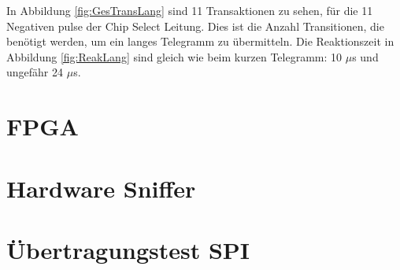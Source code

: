 In Abbildung \ref{fig:GesTransLang} sind 11 Transaktionen zu sehen, für die 11 Negativen pulse der Chip Select Leitung. Dies ist die Anzahl Transitionen, die benötigt werden, um ein langes Telegramm zu übermitteln. Die Reaktionszeit in Abbildung \ref{fig:ReakLang} sind gleich wie beim kurzen Telegramm: 10 $\mu$s und ungefähr 24 $\mu$s.





\section{FPGA}
\label{sec:ResultatFPGA}



\section{Hardware Sniffer}
\label{sec:ResultatHardware}




\section{Übertragungstest SPI}
\label{sec:ResultatÜbertragungSPI}









